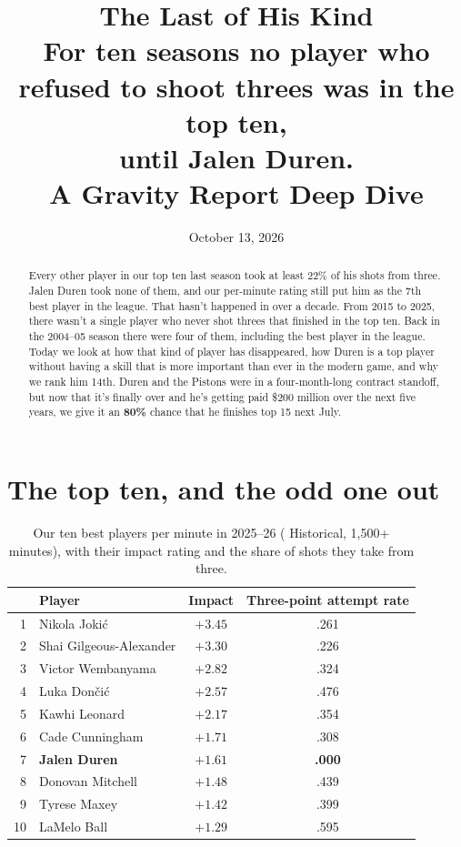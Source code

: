 \documentclass[11pt]{article}
\title{\textbf{The Last of His Kind}\\[4pt]
\large For ten seasons no player who refused to shoot threes was in the top ten,\\
until Jalen Duren.\\[2pt]
\normalsize A Gravity Report Deep Dive}
\author{}
\date{October 13, 2026}
\begin{document}
\maketitle
\vspace{-2.5em}

\begin{abstract}
\noindent
Every other player in our top ten last season took at least 22\% of his shots from three.
Jalen Duren took none of them, and our per-minute rating still put him as the 7th best player
in the league. That hasn't happened in over a decade. From 2015 to 2025, there wasn't a single
player who never shot threes that finished in the top ten. Back in the 2004--05 season there
were four of them, including the best player in the league. Today we look at how that kind of
player has disappeared, how Duren is a top player without having a skill that is more
important than ever in the modern game, and why we rank him 14th. Duren and the Pistons were
in a four-month-long contract standoff, but now that it's finally over and he's getting paid
\$200 million over the next five years, we give it an \textbf{80\%} chance that he finishes
top 15 next July.
\end{abstract}

\section*{The top ten, and the odd one out}

\begin{table}[h]
\centering\small
\caption{Our ten best players per minute in 2025--26 (\gravity{} Historical, 1,500+ minutes), with
their impact rating and the share of shots they take from three.}
\begin{tabular}{rlcc}
\toprule
& Player & Impact & Three-point attempt rate \\
\midrule
1 & Nikola Jokić & $+3.45$ & .261 \\
2 & Shai Gilgeous-Alexander & $+3.30$ & .226 \\
3 & Victor Wembanyama & $+2.82$ & .324 \\
4 & Luka Dončić & $+2.57$ & .476 \\
5 & Kawhi Leonard & $+2.17$ & .354 \\
6 & Cade Cunningham & $+1.71$ & .308 \\
7 & \textbf{Jalen Duren} & $\mathbf{+1.61}$ & \textbf{.000} \\
8 & Donovan Mitchell & $+1.48$ & .439 \\
9 & Tyrese Maxey & $+1.42$ & .399 \\
10 & LaMelo Ball & $+1.29$ & .595 \\
\bottomrule
\end{tabular}
\label{tab:top10}
\end{table}
\end{document}

